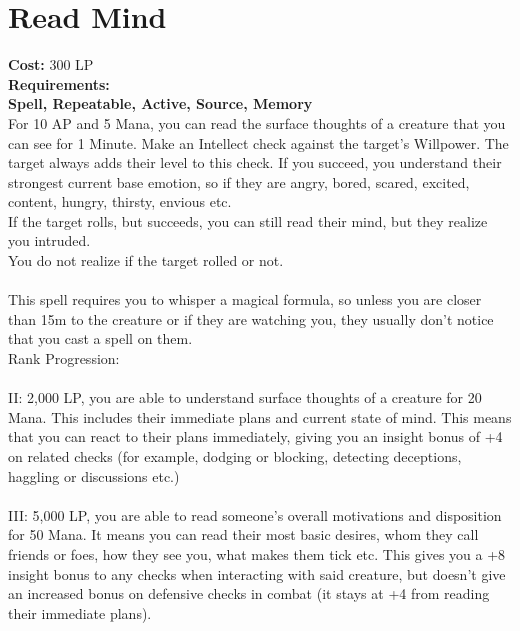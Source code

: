 \section{Read Mind}\label{spell:readMind}
\textbf{Cost:} 300 LP\\
\textbf{Requirements:}\\
\textbf{Spell, Repeatable, Active, Source, Memory}\\
For 10 AP and 5 Mana, you can read the surface thoughts of a creature that you can see for 1 Minute.
Make an Intellect check against the target's Willpower.
The target always adds their level to this check.
If you succeed, you understand their strongest current base emotion, so if they are angry, bored, scared, excited, content, hungry, thirsty, envious etc.\\
If the target rolls, but succeeds, you can still read their mind, but they realize you intruded.\\
You do not realize if the target rolled or not.\\
\\
This spell requires you to whisper a magical formula, so unless you are closer than 15m to the creature or if they are watching you, they usually don't notice that you cast a spell on them.
\\
Rank Progression:\\
\\
II: 2,000 LP, you are able to understand surface thoughts of a creature for 20 Mana.
This includes their immediate plans and current state of mind.
This means that you can react to their plans immediately, giving you an insight bonus of +4 on related checks (for example, dodging or blocking, detecting deceptions, haggling or discussions etc.)\\
\\
III: 5,000 LP, you are able to read someone's overall motivations and disposition for 50 Mana.
It means you can read their most basic desires, whom they call friends or foes, how they see you, what makes them tick etc.
This gives you a +8 insight bonus to any checks when interacting with said creature, but doesn't give an increased bonus on defensive checks in combat (it stays at +4 from reading their immediate plans).\\